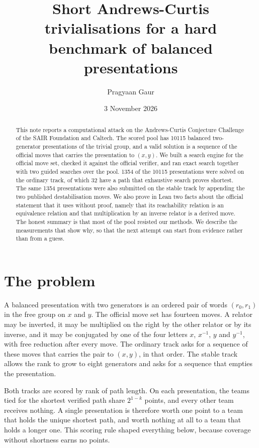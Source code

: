 \documentclass[11pt]{article}
\title{Short Andrews-Curtis trivialisations for a hard benchmark of balanced presentations}
\author{Pragyaan Gaur}
\date{3 November 2026}
\newcommand{\nSolvedAC}{1354}
\newcommand{\nSolvedStable}{1354}
\newcommand{\nProved}{32}
\newcommand{\poolSize}{10115}
\begin{document}
\maketitle

\begin{abstract}
This note reports a computational attack on the Andrews-Curtis Conjecture Challenge of the SAIR Foundation and Caltech. The scored pool has \poolSize{} balanced two-generator presentations of the trivial group, and a valid solution is a sequence of the official moves that carries the presentation to $(x,y)$. We built a search engine for the official move set, checked it against the official verifier, and ran exact search together with two guided searches over the pool. \nSolvedAC{} of the \poolSize{} presentations were solved on the ordinary track, of which \nProved{} have a path that exhaustive search proves shortest. The same \nSolvedStable{} presentations were also submitted on the stable track by appending the two published destabilisation moves. We also prove in Lean two facts about the official statement that it uses without proof, namely that its reachability relation is an equivalence relation and that multiplication by an inverse relator is a derived move. The honest summary is that most of the pool resisted our methods. We describe the measurements that show why, so that the next attempt can start from evidence rather than from a guess.
\end{abstract}

\section{The problem}

A balanced presentation with two generators is an ordered pair of words $(r_0,r_1)$ in the free group on $x$ and $y$. The official move set has fourteen moves. A relator may be inverted, it may be multiplied on the right by the other relator or by its inverse, and it may be conjugated by one of the four letters $x$, $x^{-1}$, $y$ and $y^{-1}$, with free reduction after every move. The ordinary track asks for a sequence of these moves that carries the pair to $(x,y)$, in that order. The stable track allows the rank to grow to eight generators and asks for a sequence that empties the presentation.

Both tracks are scored by rank of path length. On each presentation, the teams tied for the shortest verified path share $2^{1-k}$ points, and every other team receives nothing. A single presentation is therefore worth one point to a team that holds the unique shortest path, and worth nothing at all to a team that holds a longer one. This scoring rule shaped everything below, because coverage without shortness earns no points.
\end{document}
